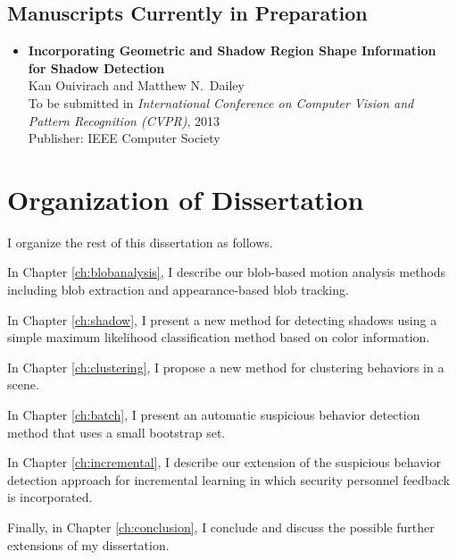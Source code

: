 \subsection*{Manuscripts Currently in Preparation}

\begin{itemize}
  \renewcommand\labelitemi{--}

  \item {\bf{Incorporating Geometric and Shadow Region Shape
    Information for Shadow Detection}}\\ Kan Ouivirach and Matthew N.\
    Dailey\\ To be submitted in \textit{International Conference on
    Computer Vision and Pattern Recognition (CVPR)}, 2013\\ Publisher:
    IEEE Computer Society

\end{itemize}

\section{Organization of Dissertation}

I organize the rest of this dissertation as follows.

In Chapter \ref{ch:blobanalysis}, I describe our blob-based motion
analysis methods including blob extraction and appearance-based blob
tracking.

In Chapter \ref{ch:shadow}, I present a new method for detecting
shadows using a simple maximum likelihood classification method based
on color information.

In Chapter \ref{ch:clustering}, I propose a new method for clustering
behaviors in a scene.

In Chapter \ref{ch:batch}, I present an automatic suspicious behavior
detection method that uses a small bootstrap set.

In Chapter \ref{ch:incremental}, I describe our extension of the
suspicious behavior detection approach for incremental learning in
which security personnel feedback is incorporated.

Finally, in Chapter \ref{ch:conclusion}, I conclude and discuss the
possible further extensions of my dissertation.

\FloatBarrier




